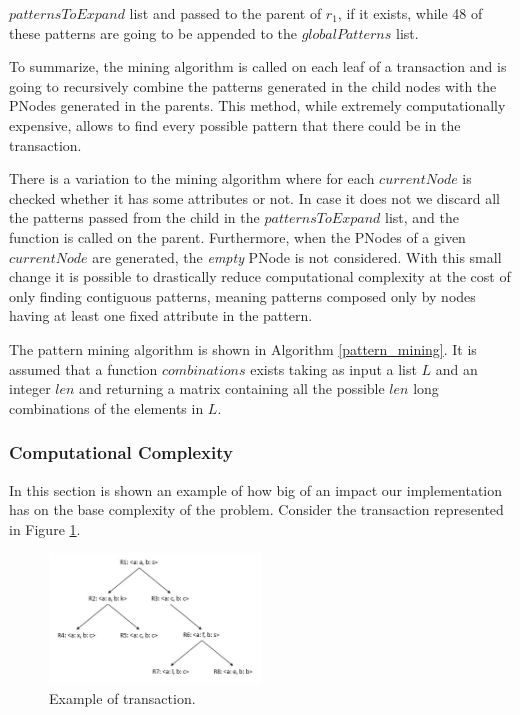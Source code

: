 \documentclass{acm_proc_article-sp-sigmod09}
\begin{document}
$patternsToExpand$ list and passed to the parent of $r_1$, if it exists, while 48 of these patterns are going to be appended to the $globalPatterns$ list.

To summarize, the mining algorithm is called on each leaf of a transaction and is going to recursively combine the patterns generated in the child nodes with the PNodes generated in the parents. This method, while extremely computationally expensive, allows to find every possible pattern that there could be in the transaction.

There is a variation to the mining algorithm where for each $currentNode$ is checked whether it has some attributes or not. In case it does not we discard all the patterns passed from the child in the $patternsToExpand$ list, and the function is called on the parent. Furthermore, when the PNodes of a given $currentNode$ are generated, the \emph{empty} PNode is not considered. With this small change it is possible to drastically reduce computational complexity at the cost of only finding contiguous patterns, meaning patterns composed only by nodes having at least one fixed attribute in the pattern.

The pattern mining algorithm is shown in Algorithm \ref{pattern_mining}. It is assumed that a function $combinations$ exists taking as input a list $L$ and an integer $len$ and returning a matrix containing all the possible $len$ long combinations of the elements in $L$.

\subsubsection{Computational Complexity}
In this section is shown an example of how big of an impact our implementation has on the base complexity of the problem. Consider the transaction represented in Figure \ref{fig:transactionFullComplexity}.

\begin{figure}[h!]
\centering
\includegraphics[width=0.5\textwidth]{FullTransactionExample.jpg}
\caption{Example of transaction.}
\label{fig:transactionFullComplexity}
\end{figure}
\end{document}
